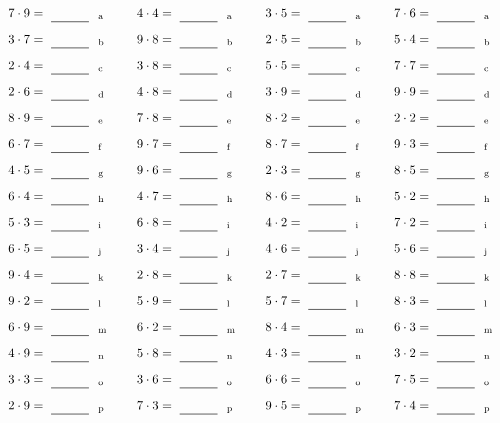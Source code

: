 \documentclass
[
  draft    = true,
  fontsize = 11pt,
  parskip  = half-
]
{scrartcl}
\begin{document}
\par\vfill\par
\begin{align*}
    \pline{7\cdot9}&=\rline{a}
  & \pline{4\cdot4}&=\rline{a}
  & \pline{3\cdot5}&=\rline{a}
  & \pline{7\cdot6}&=\rline{a} \\[1ex]
    \pline{3\cdot7}&=\rline{b}
  & \pline{9\cdot8}&=\rline{b}
  & \pline{2\cdot5}&=\rline{b}
  & \pline{5\cdot4}&=\rline{b} \\[1ex]
    \pline{2\cdot4}&=\rline{c}
  & \pline{3\cdot8}&=\rline{c}
  & \pline{5\cdot5}&=\rline{c}
  & \pline{7\cdot7}&=\rline{c} \\[1ex]
    \pline{2\cdot6}&=\rline{d}
  & \pline{4\cdot8}&=\rline{d}
  & \pline{3\cdot9}&=\rline{d}
  & \pline{9\cdot9}&=\rline{d} \\[1ex]
    \pline{8\cdot9}&=\rline{e}
  & \pline{7\cdot8}&=\rline{e}
  & \pline{8\cdot2}&=\rline{e}
  & \pline{2\cdot2}&=\rline{e} \\[1ex]
    \pline{6\cdot7}&=\rline{f}
  & \pline{9\cdot7}&=\rline{f}
  & \pline{8\cdot7}&=\rline{f}
  & \pline{9\cdot3}&=\rline{f} \\[1ex]
    \pline{4\cdot5}&=\rline{g}
  & \pline{9\cdot6}&=\rline{g}
  & \pline{2\cdot3}&=\rline{g}
  & \pline{8\cdot5}&=\rline{g} \\[1ex]
    \pline{6\cdot4}&=\rline{h}
  & \pline{4\cdot7}&=\rline{h}
  & \pline{8\cdot6}&=\rline{h}
  & \pline{5\cdot2}&=\rline{h} \\[1ex]
    \pline{5\cdot3}&=\rline{i}
  & \pline{6\cdot8}&=\rline{i}
  & \pline{4\cdot2}&=\rline{i}
  & \pline{7\cdot2}&=\rline{i} \\[1ex]
    \pline{6\cdot5}&=\rline{j}
  & \pline{3\cdot4}&=\rline{j}
  & \pline{4\cdot6}&=\rline{j}
  & \pline{5\cdot6}&=\rline{j} \\[1ex]
    \pline{9\cdot4}&=\rline{k}
  & \pline{2\cdot8}&=\rline{k}
  & \pline{2\cdot7}&=\rline{k}
  & \pline{8\cdot8}&=\rline{k} \\[1ex]
    \pline{9\cdot2}&=\rline{l}
  & \pline{5\cdot9}&=\rline{l}
  & \pline{5\cdot7}&=\rline{l}
  & \pline{8\cdot3}&=\rline{l} \\[1ex]
    \pline{6\cdot9}&=\rline{m}
  & \pline{6\cdot2}&=\rline{m}
  & \pline{8\cdot4}&=\rline{m}
  & \pline{6\cdot3}&=\rline{m} \\[1ex]
    \pline{4\cdot9}&=\rline{n}
  & \pline{5\cdot8}&=\rline{n}
  & \pline{4\cdot3}&=\rline{n}
  & \pline{3\cdot2}&=\rline{n} \\[1ex]
    \pline{3\cdot3}&=\rline{o}
  & \pline{3\cdot6}&=\rline{o}
  & \pline{6\cdot6}&=\rline{o}
  & \pline{7\cdot5}&=\rline{o} \\[1ex]
    \pline{2\cdot9}&=\rline{p}
  & \pline{7\cdot3}&=\rline{p}
  & \pline{9\cdot5}&=\rline{p}
  & \pline{7\cdot4}&=\rline{p}
\end{align*}
\end{document}
